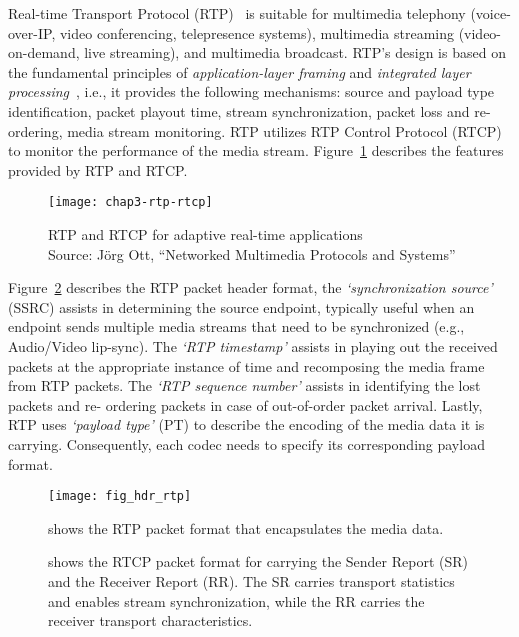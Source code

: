 
Real-time Transport Protocol (RTP)~\cite{rfc3550} is suitable for multimedia
telephony (voice-over-IP, video conferencing, telepresence systems),
multimedia streaming (video-on-demand, live streaming), and multimedia
broadcast. RTP's design is based on the fundamental principles of \textit
{application-layer framing} and \textit{integrated layer
processing}~\cite{clark:alf}, i.e., it provides the following mechanisms:
source and payload type identification, packet playout time, stream
synchronization, packet loss and re-ordering, media stream monitoring. RTP
utilizes RTP Control Protocol (RTCP) to monitor the performance of the media
stream. Figure~\ref{fig:3:rtp:model} describes the features provided by RTP
and RTCP.

\begin{figure}[!h]
\centerline{\texttt{[image: chap3-rtp-rtcp]}}
\caption{RTP and RTCP for adaptive real-time applications\\
{\scriptsize Source: J\"org Ott, ``Networked Multimedia Protocols and Systems''}}
\label{fig:3:rtp:model}
\end{figure}

Figure~\ref{fig:3:rtp.hdr} describes the RTP packet header format, the
\textit{`synchronization source'} (SSRC) assists in determining the source
endpoint, typically useful when an endpoint sends multiple media streams that
need to be synchronized (e.g., Audio/Video lip-sync). The \textit{`RTP
timestamp'} assists in playing out the received packets at the appropriate
instance of time and recomposing the media frame from RTP packets. The
\textit{`RTP sequence number'} assists in identifying the lost packets and re-
ordering packets in case of out-of-order packet arrival. Lastly, RTP uses
\textit{`payload type'} (PT) to describe the encoding of the media data it is
carrying. Consequently, each codec needs to specify its corresponding payload
format.

\begin{figure}[!h]
\centerline{\texttt{[image: fig\_hdr\_rtp]}}
\caption{shows the RTP packet format that encapsulates the media data.}
\label{fig:3:rtp.hdr}
\end{figure}

\begin{figure}[!h]
\caption{shows the RTCP packet format for carrying the Sender Report (SR) and
the Receiver Report (RR). The SR carries transport statistics and enables 
stream synchronization, while the RR carries the receiver transport 
characteristics.}
\label{fig:3:rtcp.hdr}
\end{figure}

